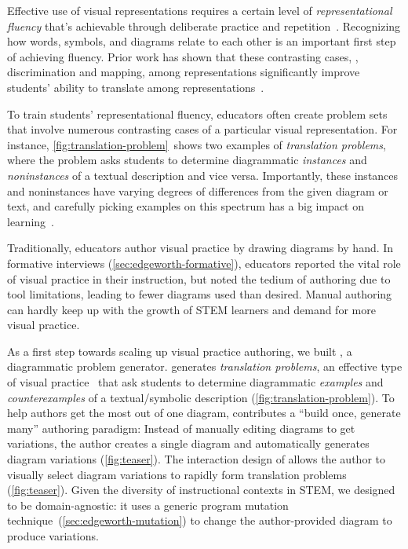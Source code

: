 Effective use of visual representations requires a certain level of \emph{representational fluency} that's achievable through deliberate practice and repetition~\cite{metarepresentation, representationalFluency}. Recognizing how words, symbols, and diagrams relate to each other is an important first step of achieving fluency. Prior work has shown that these contrasting cases, \ie, discrimination and mapping, among representations significantly improve students' ability to translate among representations~\cite{perceptualLearning}.

To train students' representational fluency, educators often create problem sets that involve numerous contrasting cases of a particular visual representation. For instance, \cref{fig:translation-problem}~shows two examples of \emph{translation problems}, where the problem asks students to determine diagrammatic \emph{instances} and \emph{noninstances} of a textual description and vice versa. Importantly, these instances and noninstances have varying degrees of differences from the given diagram or text, and carefully picking examples on this spectrum has a big impact on learning~\cite{samenessAndDifference}.

Traditionally, educators author visual practice by drawing diagrams by hand. In formative interviews (\cref{sec:edgeworth-formative}), educators reported the vital role of visual practice in their instruction, but noted the tedium of authoring due to tool limitations, leading to fewer diagrams used than desired. Manual authoring can hardly keep up with the growth of STEM learners and demand for more visual practice.

As a first step towards scaling up visual practice authoring, we built \Edgeworth, a diagrammatic problem generator. \Edgeworth generates \emph{translation problems}, an effective type of visual practice~\cite{perceptualLearning} that ask students to determine diagrammatic \emph{examples} and \emph{counterexamples} of a textual/symbolic description (\cref{fig:translation-problem}). To help authors get the most out of one diagram, \Edgeworth contributes a ``build once, generate many'' authoring paradigm: Instead of manually editing diagrams to get variations, the author creates a single diagram and \Edgeworth automatically generates diagram variations (\cref{fig:teaser}). The interaction design of \Edgeworth allows the author to visually select diagram variations to rapidly form translation problems (\cref{fig:teaser}). Given the diversity of instructional contexts in STEM, we designed \Edgeworth to be domain-agnostic: it uses a generic program mutation technique~(\cref{sec:edgeworth-mutation}) to change the author-provided diagram to produce variations. 

